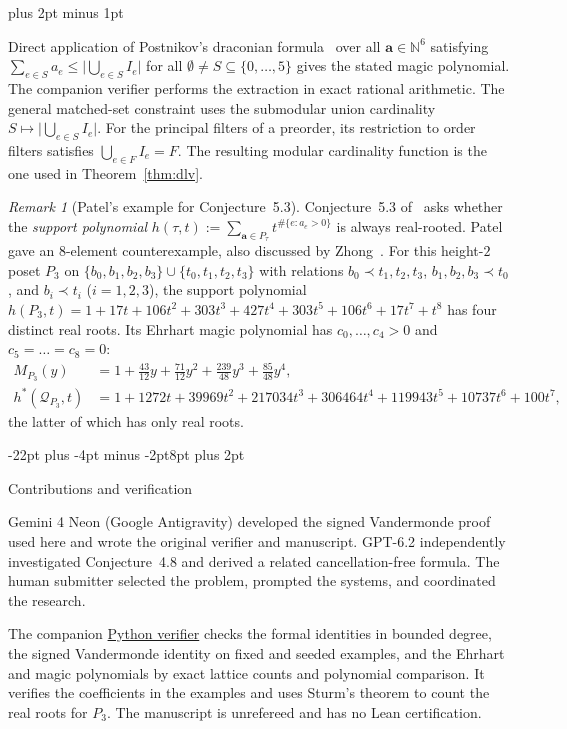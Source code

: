 \documentclass[11pt,letterpaper]{article}
\makeatletter
\renewcommand{\section}{\@startsection{section}{1}{\z@}%
  {-22pt plus -4pt minus -2pt}{8pt plus 2pt}%
  {\normalfont\fontsize{14}{17}\selectfont\bfseries\raggedright}}
\renewenvironment{proof}[1][\proofname]{%
  \par\pushQED{\qed}\normalfont
  \topsep9pt plus 2pt minus 1pt\relax
  \trivlist\item[\hskip\labelsep\itshape #1\@addpunct{.}]\ignorespaces
}{\popQED\endtrivlist\@endpefalse}
\theoremstyle{result}
\theoremstyle{definition}
\theoremstyle{remark}
\newtheorem{remark}[theorem]{Remark}
\newcommand{\NN}{\mathbb{N}}
\newcommand{\qQ}{\mathcal{Q}}
\makeatother
\begin{document}
\begin{proof}
Direct application of Postnikov's draconian formula~\cite[Theorem~11.3]{Pos09} over all $\mathbf{a}\in\NN^6$ satisfying $\sum_{e\in S} a_e\le \bigl|\bigcup_{e\in S} I_e\bigr|$ for all $\emptyset\ne S\subseteq\{0,\dots,5\}$ gives the stated magic polynomial. The companion verifier performs the extraction in exact rational arithmetic. The general matched-set constraint uses the submodular union cardinality $S\mapsto\bigl|\bigcup_{e\in S}I_e\bigr|$. For the principal filters of a preorder, its restriction to order filters satisfies $\bigcup_{e\in F}I_e=F$. The resulting modular cardinality function is the one used in Theorem~\ref{thm:dlv}.
\end{proof}

\begin{remark}[Patel's example for Conjecture~5.3]\label{rem:conj53}
Conjecture~5.3 of~\cite{AC26} asks whether the \emph{support polynomial} $h(\tau,t):=\sum_{\mathbf{a}\in P_\tau} t^{\#\{e: a_e>0\}}$ is always real-rooted. Patel~\cite{Patel} gave an $8$-element counterexample, also discussed by Zhong~\cite[Example~4]{Zho26}. For this height-$2$ poset $P_3$ on $\{b_0,b_1,b_2,b_3\}\cup\{t_0,t_1,t_2,t_3\}$ with relations $b_0\prec t_1,t_2,t_3$, $b_1,b_2,b_3\prec t_0$, and $b_i\prec t_i$ ($i=1,2,3$), the support polynomial $h(P_3,t)=1+17t+106t^2+303t^3+427t^4+303t^5+106t^6+17t^7+t^8$ has four distinct real roots. Its Ehrhart magic polynomial has $c_0,\dots,c_4>0$ and $c_5=\dots=c_8=0$:
\begin{align*}
M_{P_3}(y) &= 1 + \frac{43}{12}y + \frac{71}{12}y^2 + \frac{239}{48}y^3 + \frac{85}{48}y^4, \\
h^*(\qQ_{P_3},t) &= 1 + 1272t + 39969t^2 + 217034t^3 + 306464t^4 + 119943t^5 + 10737t^6 + 100t^7,
\end{align*}
the latter of which has only real roots.
\end{remark}

\begin{samepage}
\section{Contributions and verification}
\label{sec:attribution}

Gemini 4 Neon (Google Antigravity) developed the signed Vandermonde proof used here and wrote the original verifier and manuscript. GPT-6.2 independently investigated Conjecture~4.8 and derived a related cancellation-free formula. The human submitter selected the problem, prompted the systems, and coordinated the research.

The companion \href{https://github.com/CosmicCrusader23/mathslopslopslop/blob/284813d9a069ae81b3510376332afc7060895be4/proofs/athanasiadis-chapoton-conj-4.8-proof/verify.py}{Python verifier} checks the formal identities in bounded degree, the signed Vandermonde identity on fixed and seeded examples, and the Ehrhart and magic polynomials by exact lattice counts and polynomial comparison. It verifies the coefficients in the examples and uses Sturm's theorem to count the real roots for $P_3$. The manuscript is unrefereed and has no Lean certification.
\end{samepage}
\end{document}

